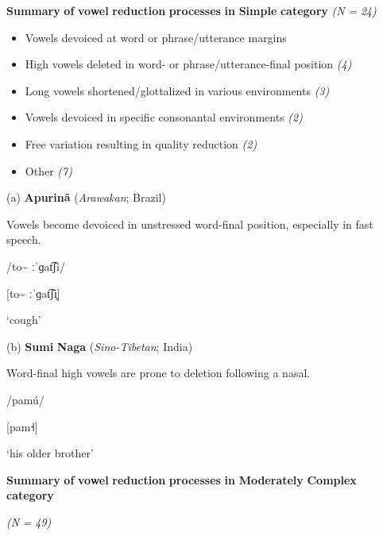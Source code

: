 \ea\label{ex:(6.16)}
  \textbf{Summary} \textbf{of} \textbf{vowel} \textbf{reduction} \textbf{processes} \textbf{in} \textbf{Simple} \textbf{category} \textit{(N} \textit{=} \textit{24)}

\begin{itemize}
\item 
Vowels devoiced at word or phrase/utterance margins \textit{}

\item 
High vowels deleted in word- or phrase/utterance-final position \textit{(4)}

\item 
Long vowels shortened/glottalized in various environments \textit{(3)}

\item 
Vowels devoiced in specific consonantal environments \textit{(2)}

\item 
Free variation resulting in quality reduction \textit{(2)}

\item 
Other \textit{(7)}

\end{itemize}

(a)   \textbf{Apurinã} (\textit{Arawakan}; Brazil)

Vowels become devoiced in unstressed word-final position, especially in fast speech.

/to\~{} ːˈɡat͡ʃi/

[to\~{} ːˈɡat͡ʃi̥]

‘cough’

\citep[60-1]{Facundes2000}

(b)   \textbf{Sumi} \textbf{Naga} (\textit{Sino-Tibetan}; India)

Word-final high vowels are prone to deletion following a nasal.

/pamú/

[pam˧]

‘his older brother’

\citep[369]{Teo2012}
\z

\ea\label{ex:(6.17)}
  \textbf{Summary} \textbf{of} \textbf{vowel} \textbf{reduction} \textbf{processes} \textbf{in} \textbf{Moderately} \textbf{Complex} \textbf{category} 

\textit{(N} \textit{=} \textit{49)}

